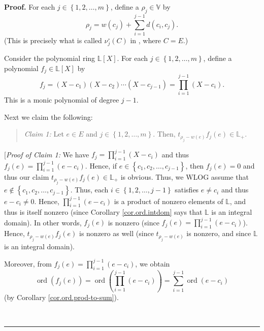 \documentclass[numbers=enddot,12pt,final,onecolumn,notitlepage]{scrartcl}%
\theoremstyle{definition}
\newenvironment{statement}{\begin{quote}}{\end{quote}}
\newenvironment{proof}[1][Proof]{\noindent\textbf{#1.} }{\ \rule{0.5em}{0.5em}}
\let\sumnonlimits\sum
\let\prodnonlimits\prod
\renewcommand{\sum}{\sumnonlimits\limits}
\renewcommand{\prod}{\prodnonlimits\limits}
\theoremstyle{plainsl}
\begin{document}
\begin{proof}
For each $j\in\left\{  1,2,\ldots,m\right\}  $, define a $\rho_{j}%
\in\mathbb{V}$ by%
\begin{equation}
\rho_{j}=w\left(  c_{j}\right)  +\sum_{i=1}^{j-1}d\left(  c_{i},c_{j}\right)
. \label{pf.thm.poly-ut-greed.rhoj=}%
\end{equation}
(This is precisely what is called $\nu_{j}^{\circ}\left(  C\right)  $ in
\cite{GriPet19}, where $C=E$.)

Consider the polynomial ring $\mathbb{L}\left[  X\right]  $. For each
$j\in\left\{  1,2,\ldots,m\right\}  $, define a polynomial $f_{j}\in
\mathbb{L}\left[  X\right]  $ by
\[
f_{j}=\left(  X-c_{1}\right)  \left(  X-c_{2}\right)  \cdots\left(
X-c_{j-1}\right)  =\prod_{i=1}^{j-1}\left(  X-c_{i}\right)  .
\]
This is a monic polynomial of degree $j-1$.

Next we claim the following:

\begin{statement}
\textit{Claim 1:} Let $e\in E$ and $j\in\left\{  1,2,\ldots,m\right\}  $.
Then, $t_{\rho_{j}-w\left(  e\right)  }f_{j}\left(  e\right)  \in
\mathbb{L}_{+}$.
\end{statement}

[\textit{Proof of Claim 1:} We have $f_{j}=\prod_{i=1}^{j-1}\left(
X-c_{i}\right)  $ and thus $f_{j}\left(  e\right)  =\prod_{i=1}^{j-1}\left(
e-c_{i}\right)  $. Hence, if $e\in\left\{  c_{1},c_{2},\ldots,c_{j-1}\right\}
$, then $f_{j}\left(  e\right)  =0$ and thus our claim $t_{\rho_{j}-w\left(
e\right)  }f_{j}\left(  e\right)  \in\mathbb{L}_{+}$ is obvious. Thus, we WLOG
assume that $e\notin\left\{  c_{1},c_{2},\ldots,c_{j-1}\right\}  $. Thus, each
$i\in\left\{  1,2,\ldots,j-1\right\}  $ satisfies $e\neq c_{i}$ and thus
$e-c_{i}\neq0$. Hence, $\prod_{i=1}^{j-1}\left(  e-c_{i}\right)  $ is a
product of nonzero elements of $\mathbb{L}$, and thus is itself nonzero (since
Corollary \ref{cor.ord.intdom} says that $\mathbb{L}$ is an integral domain).
In other words, $f_{j}\left(  e\right)  $ is nonzero (since $f_{j}\left(
e\right)  =\prod_{i=1}^{j-1}\left(  e-c_{i}\right)  $). Hence, $t_{\rho
_{j}-w\left(  e\right)  }f_{j}\left(  e\right)  $ is nonzero as well (since
$t_{\rho_{j}-w\left(  e\right)  }$ is nonzero, and since $\mathbb{L}$ is an
integral domain).

Moreover, from $f_{j}\left(  e\right)  =\prod_{i=1}^{j-1}\left(
e-c_{i}\right)  $, we obtain%
\begin{equation}
\operatorname*{ord}\left(  f_{j}\left(  e\right)  \right)
=\operatorname*{ord}\left(  \prod_{i=1}^{j-1}\left(  e-c_{i}\right)  \right)
=\sum_{i=1}^{j-1}\operatorname*{ord}\left(  e-c_{i}\right)
\label{pf.thm.poly-ut-greed.c1.pf.ordfj}%
\end{equation}
(by Corollary \ref{cor.ord.prod-to-sum}).


\end{proof}
\end{document}
